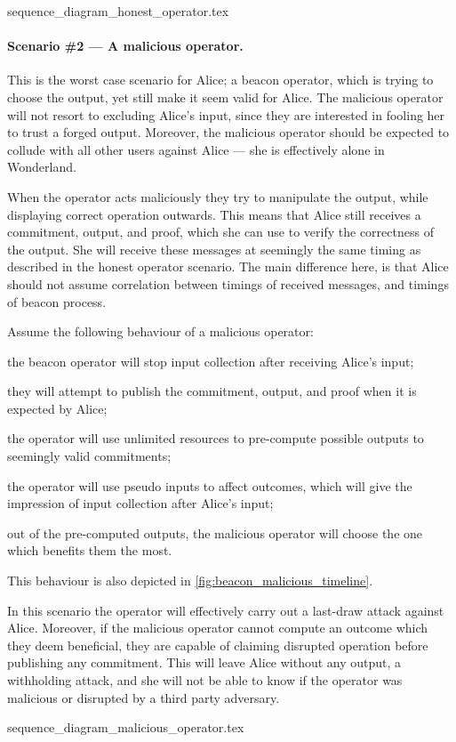 {sequence_diagram_honest_operator.tex}

\paragraph{Scenario \#2 --- A malicious operator.}
This is the worst case scenario for Alice; a beacon operator, which is trying to choose the output, yet still make it seem valid for Alice.
The malicious operator will not resort to excluding Alice's input, since they are interested in fooling her to trust a forged output.
Moreover, the malicious operator should be expected to collude with all other users against Alice --- she is effectively alone in Wonderland.

When the operator acts maliciously they try to manipulate the output, while displaying correct operation outwards.
This means that Alice still receives a commitment, output, and proof, which she can use to verify the correctness of the output.
She will receive these messages at seemingly the same timing as described in the honest operator scenario.
The main difference here, is that Alice should not assume correlation between timings of received messages, and timings of beacon process.

Assume the following behaviour of a malicious operator:
\begin{eletterate*}
\item the beacon operator will stop input collection after receiving Alice's input;
\item they will attempt to publish the commitment, output, and proof when it is expected by Alice;
\item the operator will use unlimited resources to pre-compute possible outputs to seemingly valid commitments;
\item the operator will use pseudo inputs to affect outcomes, which will give the impression of input collection after Alice's input;
\item out of the pre-computed outputs, the malicious operator will choose the one which benefits them the most.
\end{eletterate*}
This behaviour is also depicted in \cref{fig:beacon_malicious_timeline}.

In this scenario the operator will effectively carry out a last-draw attack against Alice.
Moreover, if the malicious operator cannot compute an outcome which they deem beneficial, they are capable of claiming disrupted operation before publishing any commitment.
This will leave Alice without any output, a withholding attack, and she will not be able to know if the operator was malicious or disrupted by a third party adversary.

{sequence_diagram_malicious_operator.tex}

